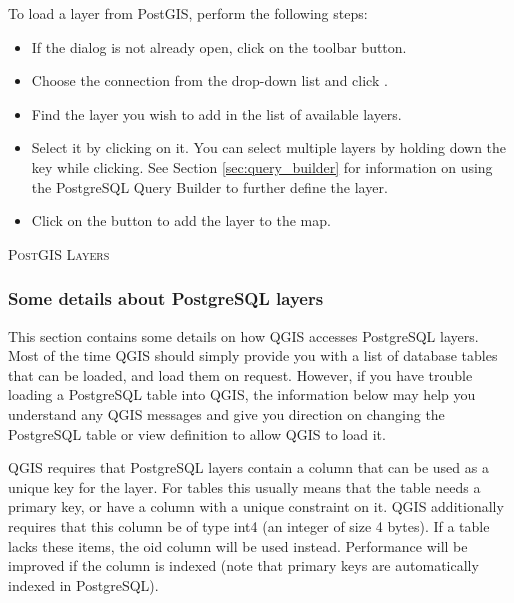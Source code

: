 To load a layer from PostGIS, perform the following steps:

\begin{itemize}
\item If the  dialog is not already open, click on the
 toolbar button.
\item Choose the connection from the drop-down list and click .
\item Find the layer you wish to add in the list of available layers.
\item Select it by clicking on it. You can select multiple layers by holding
down the  key while clicking. See Section \ref{sec:query_builder} for
information on using the PostgreSQL Query Builder to further define the layer.
\item Click on the  button to add the layer to the map.
\end{itemize}

\begin{Tip}\caption{\textsc{PostGIS Layers}}
\end{Tip}

\subsubsection{Some details about PostgreSQL
layers}\label{sec:postgis_details}

This section contains some details on how QGIS accesses PostgreSQL
layers. Most of the time QGIS should simply provide you with a list of
database tables that can be loaded, and load them on request. However,
if you have trouble loading a PostgreSQL table into QGIS, the information
below may help you understand any QGIS messages and give you direction on
changing the PostgreSQL table or view definition to allow QGIS to load it.

QGIS requires that PostgreSQL layers contain a column that can be
used as a unique key for the layer. For tables this usually means
that the table needs a primary key, or have a column with a unique
constraint on it. QGIS additionally requires that this column be of
type int4 (an integer of size 4 bytes). If a table lacks these items,
the oid column will be used instead. Performance will be improved if the
column is indexed (note that primary keys are automatically indexed in
PostgreSQL). 

